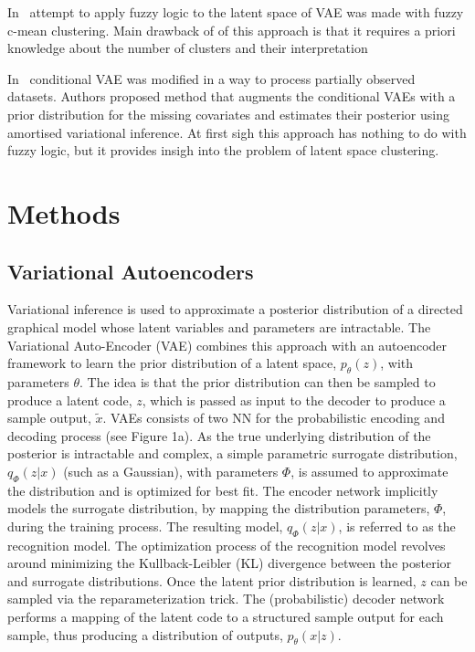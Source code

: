 \documentclass[runningheads]{llncs}
\begin{document}
In~\cite{Bolat2020} attempt to apply fuzzy logic to the latent space of VAE was made with fuzzy c-mean clustering.
Main drawback of of this approach is that it requires a priori knowledge about the number of clusters and their interpretation


In~\cite{RAMCHANDRAN2024110113} conditional VAE was modified in a way to process partially observed datasets. 
Authors proposed method that augments the conditional VAEs with a prior distribution for the missing covariates and estimates their posterior using amortised variational inference.
At first sigh this approach has nothing to do with fuzzy logic, but it provides insigh into the problem of latent space clustering.



\section{Methods}

\subsection{Variational Autoencoders}
Variational inference is used to approximate a posterior distribution of a directed graphical model whose latent variables and parameters are intractable.
The Variational Auto-Encoder (VAE) combines this approach with an autoencoder framework to learn the prior distribution of a latent space, $p_\theta(z)$, with parameters $\theta$.
The idea is that the prior distribution can then be sampled to produce a latent code, $z$, which is passed as input to the decoder to produce a sample output, $\tilde{x}$. 
VAEs consists of two NN for the probabilistic encoding and decoding process (see Figure 1a). 
As the true underlying distribution of the posterior is intractable and complex, a simple parametric surrogate distribution, $q_\Phi(z|x)$ (such as a Gaussian), with parameters $\Phi$, is assumed to approximate the distribution and is optimized for best fit. 
The encoder network implicitly models the surrogate distribution, by mapping the distribution parameters, $\Phi$, during the training process. 
The resulting model, $q_\Phi(z|x)$, is referred to as the recognition model. 
The optimization process of the recognition model revolves around minimizing the Kullback-Leibler (KL) divergence between the posterior and surrogate distributions.
Once the latent prior distribution is learned, $z$ can be sampled via the reparameterization trick.
The (probabilistic) decoder network performs a mapping of the latent code to a structured sample output for each sample, thus producing a distribution of outputs, $p_\theta (x|z)$.
\end{document}
